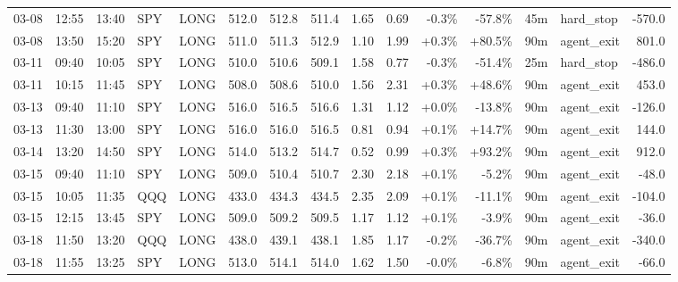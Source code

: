 \documentclass[11pt,a4paper,twoside]{article}
\begin{document}
\begin{landscape}
\begin{center}
\begin{longtable}{>{\color{txtmain}}l l l l l r r r r r r r r >{\color{txtmain}}l r}
03-08 & 12:55 & 13:40 & SPY & LONG & 512.0 & 512.8 & 511.4 & 1.65 & 0.69 & \textcolor{lossred}{-0.3\%} & \textcolor{lossred}{-57.8\%} & 45m & hard\_stop & \textcolor{lossred}{-570.0} \\
03-08 & 13:50 & 15:20 & SPY & LONG & 511.0 & 511.3 & 512.9 & 1.10 & 1.99 & \textcolor{wingreen}{+0.3\%} & \textcolor{wingreen}{+80.5\%} & 90m & agent\_exit & \textcolor{wingreen}{801.0} \\
03-11 & 09:40 & 10:05 & SPY & LONG & 510.0 & 510.6 & 509.1 & 1.58 & 0.77 & \textcolor{lossred}{-0.3\%} & \textcolor{lossred}{-51.4\%} & 25m & hard\_stop & \textcolor{lossred}{-486.0} \\
03-11 & 10:15 & 11:45 & SPY & LONG & 508.0 & 508.6 & 510.0 & 1.56 & 2.31 & \textcolor{wingreen}{+0.3\%} & \textcolor{wingreen}{+48.6\%} & 90m & agent\_exit & \textcolor{wingreen}{453.0} \\
03-13 & 09:40 & 11:10 & SPY & LONG & 516.0 & 516.5 & 516.6 & 1.31 & 1.12 & \textcolor{wingreen}{+0.0\%} & \textcolor{lossred}{-13.8\%} & 90m & agent\_exit & \textcolor{lossred}{-126.0} \\
03-13 & 11:30 & 13:00 & SPY & LONG & 516.0 & 516.0 & 516.5 & 0.81 & 0.94 & \textcolor{wingreen}{+0.1\%} & \textcolor{wingreen}{+14.7\%} & 90m & agent\_exit & \textcolor{wingreen}{144.0} \\
03-14 & 13:20 & 14:50 & SPY & LONG & 514.0 & 513.2 & 514.7 & 0.52 & 0.99 & \textcolor{wingreen}{+0.3\%} & \textcolor{wingreen}{+93.2\%} & 90m & agent\_exit & \textcolor{wingreen}{912.0} \\
03-15 & 09:40 & 11:10 & SPY & LONG & 509.0 & 510.4 & 510.7 & 2.30 & 2.18 & \textcolor{wingreen}{+0.1\%} & \textcolor{lossred}{-5.2\%} & 90m & agent\_exit & \textcolor{lossred}{-48.0} \\
03-15 & 10:05 & 11:35 & QQQ & LONG & 433.0 & 434.3 & 434.5 & 2.35 & 2.09 & \textcolor{wingreen}{+0.1\%} & \textcolor{lossred}{-11.1\%} & 90m & agent\_exit & \textcolor{lossred}{-104.0} \\
03-15 & 12:15 & 13:45 & SPY & LONG & 509.0 & 509.2 & 509.5 & 1.17 & 1.12 & \textcolor{wingreen}{+0.1\%} & \textcolor{lossred}{-3.9\%} & 90m & agent\_exit & \textcolor{lossred}{-36.0} \\
03-18 & 11:50 & 13:20 & QQQ & LONG & 438.0 & 439.1 & 438.1 & 1.85 & 1.17 & \textcolor{lossred}{-0.2\%} & \textcolor{lossred}{-36.7\%} & 90m & agent\_exit & \textcolor{lossred}{-340.0} \\
03-18 & 11:55 & 13:25 & SPY & LONG & 513.0 & 514.1 & 514.0 & 1.62 & 1.50 & \textcolor{lossred}{-0.0\%} & \textcolor{lossred}{-6.8\%} & 90m & agent\_exit & \textcolor{lossred}{-66.0} \\

\end{longtable}
\end{center}
\end{landscape}
\end{document}
